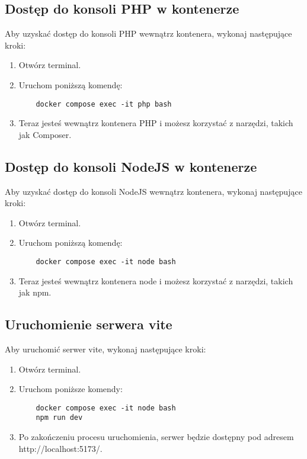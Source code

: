 \documentclass{article}
\begin{document}
\subsection{Dostęp do konsoli PHP w kontenerze}
Aby uzyskać dostęp do konsoli PHP wewnątrz kontenera, wykonaj następujące kroki:
\begin{enumerate}
    \item Otwórz terminal.
    \item Uruchom poniższą komendę:
    \begin{verbatim}
    docker compose exec -it php bash
    \end{verbatim}
    \item Teraz jesteś wewnątrz kontenera PHP i możesz korzystać z narzędzi, takich jak Composer.
\end{enumerate}

\subsection{Dostęp do konsoli NodeJS w kontenerze}
Aby uzyskać dostęp do konsoli NodeJS wewnątrz kontenera, wykonaj następujące kroki:
\begin{enumerate}
    \item Otwórz terminal.
    \item Uruchom poniższą komendę:
    \begin{verbatim}
    docker compose exec -it node bash
    \end{verbatim}
    \item Teraz jesteś wewnątrz kontenera node i możesz korzystać z narzędzi, takich jak npm.
\end{enumerate}

\subsection{Uruchomienie serwera vite}
Aby uruchomić serwer vite, wykonaj następujące kroki:
\begin{enumerate}
    \item Otwórz terminal.
    \item Uruchom poniższe komendy:
    \begin{verbatim}
    docker compose exec -it node bash
    npm run dev
    \end{verbatim}
    \item Po zakończeniu procesu uruchomienia, serwer będzie dostępny pod adresem http://localhost:5173/.
\end{enumerate}
\end{document}
